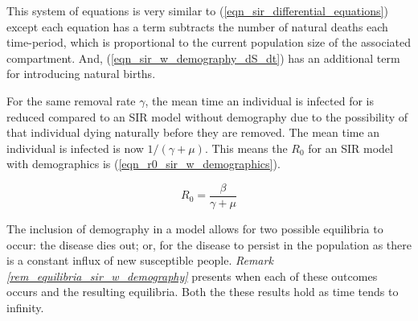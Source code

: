 \documentclass[11pt,a4paper]{article}
\theoremstyle{break}
\begin{document}
  \par This system of equations is very similar to (\ref{eqn_sir_differential_equations}) except each equation has a term subtracts the number of natural deaths each time-period, which is proportional to the current population size of the associated compartment. And, (\ref{eqn_sir_w_demography_dS_dt}) has an additional term for introducing natural births.

  \par For the same removal rate $\gamma$, the mean time an individual is infected for is reduced compared to an SIR model without demography due to the possibility of that individual dying naturally before they are removed. The mean time an individual is infected is now $1/(\gamma+\mu)$. This means the $R_0$ for an SIR model with demographics is (\ref{eqn_r0_sir_w_demographics}).

  \begin{equation}\label{eqn_r0_sir_w_demographics}
    R_0=\frac{\beta}{\gamma+\mu}
  \end{equation}

  \par The inclusion of demography in a model allows for two possible equilibria to occur: the disease dies out; or, for the disease to persist in the population as there is a constant influx of new susceptible people. \textit{Remark \ref{rem_equilibria_sir_w_demography}} presents when each of these outcomes occurs and the resulting equilibria. Both the these results hold as time tends to infinity.
\end{document}
